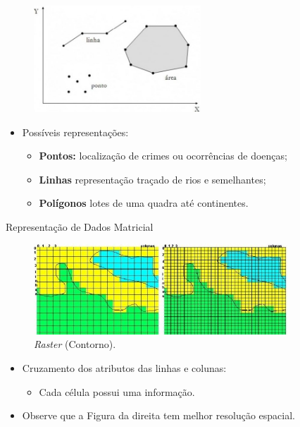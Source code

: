 \documentclass[red, tikz, aspectratio=169, xcolor=dvipsnames]{beamer}
\let\olditem=\item%
\renewcommand{\item}{\olditem \justifying}
\begin{document}
		\begin{frame}
			\begin{figure}
				\centering
				\label{fig:vetorial_data_2}
				\includegraphics[width=0.56\textwidth]{img/vetorial_data.jpg}
			\end{figure}
		
			\begin{itemize}
				\item Possíveis representações:
				\begin{itemize}
					\setlength{\itemsep}{0.7em}
					\item \textbf{Pontos:} localização de crimes ou ocorrências de doenças;
					\item \textbf{Linhas} representação traçado de rios e semelhantes;
					\item \textbf{Polígonos} lotes de uma quadra até continentes. 
				\end{itemize}
			\end{itemize}
		\end{frame}
	
		\begin{frame}{Representação de Dados Matricial}
			\vspace{-10px}
			\begin{figure}
				\centering
				\includegraphics[width=0.85\textwidth]{img/matricial_data.jpg}
				\caption{\textit{Raster} (Contorno).}
			\end{figure}
		
			\begin{itemize}
			\setlength{\itemsep}{0.4em}
			\item Cruzamento dos atributos das linhas e colunas:
			\begin{itemize}
				\item Cada célula possui uma informação.
			\end{itemize}
		
			\item Observe que a Figura da direita tem melhor resolução espacial.
			\end{itemize}
		\end{frame}
	
\end{document}
